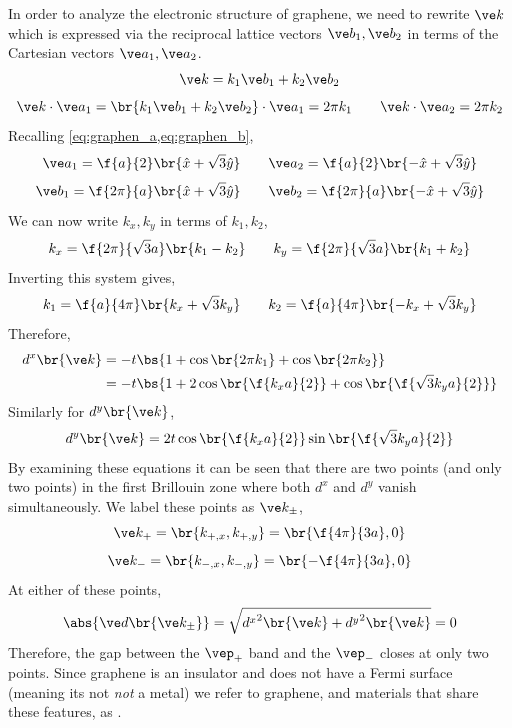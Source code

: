 \documentclass{article}
\begin{document}
In order to analyze the electronic structure of graphene, we need to rewrite $\ve k$ which is expressed via the reciprocal lattice vectors $\ve b_1, \ve b_2$ in terms of the Cartesian vectors $\ve a_1, \ve a_2$.
\[ \ve k = k_1 \ve b_1 + k_2 \ve b_2 \]
\[ \ve k \cdot \ve a_1 = \br{k_1 \ve b_1 + k_2 \ve b_2} \cdot \ve a_1 = 2 \pi k_1 \qquad \ve k \cdot \ve a_2 = 2 \pi k_2 \]
Recalling \cref{eq:graphen_a,eq:graphen_b},
\[ \ve a_{1} = \f{a}{2} \br{\hat x + \sqrt{3} \hat y} \qquad \ve a_{2} = \f{a}{2} \br{-\hat x + \sqrt{3} \hat y} \]
\[ \ve b_{1} = \f{2 \pi}{a} \br{\hat x + \sqrt{3} \hat y} \qquad \ve b_{2} = \f{2 \pi}{a} \br{-\hat x + \sqrt{3} \hat y}\]
We can now write $k_x, k_y$ in terms of $k_1, k_2$,
\[ k_x = \f{2 \pi }{\sqrt{3}a} \br{k_1 - k_2} \qquad k_y = \f{2 \pi}{\sqrt{3}a} \br{k_1 + k_2} \]
Inverting this system gives,
\[ k_1 = \f{a}{4 \pi} \br{k_x + \sqrt{3} k_y} \qquad k_2 = \f{a}{4 \pi} \br{-k_x + \sqrt{3} k_y} \]
Therefore,
\begin{align*}
    d^{x}\br{\ve k}
    &= - t\bs{1 + \cos\br{2 \pi k_1} + \cos\br{2 \pi k_2}} \\
    &= - t\bs{1 + 2\cos\br{\f{k_xa}{2}} + \cos\br{\f{\sqrt{3}k_ya}{2}}}
\end{align*}
Similarly for $d^{y}\br{\ve k}$,
\[ d^{y}\br{\ve k} = 2 t \cos\br{\f{k_x a}{2}} \sin\br{\f{\sqrt{3} k_y a}{2}} \]
By examining these equations it can be seen that there are two points (and only two points) in the first Brillouin zone where both $d^{x}$ and $d^y$ vanish simultaneously. We label these points as $\ve k_{\pm}$,
\[ \ve k_+ = \br{k_{+, x}, k_{+, y}} = \br{\f{4 \pi }{3a}, 0} \]
\[ \ve k_- = \br{k_{-, x}, k_{-, y}} = \br{-\f{4 \pi }{3a}, 0} \]
At either of these points,
\[ \abs{\ve d \br{\ve k_{\pm}}} = \sqrt{{d^x}^2\br{\ve k} + {d^y}^2\br{\ve k}} = 0 \]
Therefore, the gap between the $\vep_{+}$ band and the $\vep_{-}$ closes at only two points. Since graphene is an insulator and does not have a Fermi surface (meaning its not \textit{not} a metal) we refer to graphene, and materials that share these features, as . \\
\end{document}
